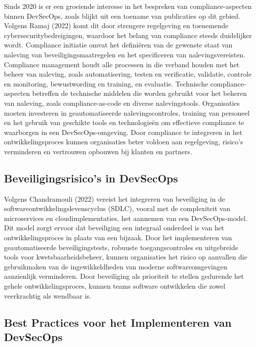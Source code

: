 \documentclass{hogent-article}
\begin{document}
   Sinds 2020 is er een groeiende interesse in het bespreken van compliance-aspecten binnen DevSecOps, zoals blijkt uit een toename van publicaties op dit gebied. Volgens Ramaj (2022) komt dit door strengere regelgeving en toenemende cybersecuritybedreigingen, waardoor het belang van compliance steeds duidelijker wordt.
   Compliance initiatie omvat het definiëren van de gewenste staat van naleving van beveiligingsmaatregelen en het specificeren van nalevingsvereisten. Compliance management houdt alle processen in die verband houden met het beheer van naleving, zoals automatisering, testen en verificatie, validatie, controle en monitoring, bewustwording en training, en evaluatie. Technische compliance-aspecten betreffen de technische middelen die worden gebruikt voor het beheren van naleving, zoals compliance-as-code en diverse nalevingstools.
   Organisaties moeten investeren in geautomatiseerde nalevingscontroles, training van personeel en het gebruik van geschikte tools en technologieën om effectieve compliance te waarborgen in een DevSecOps-omgeving. Door compliance te integreren in het ontwikkelingsproces kunnen organisaties beter voldoen aan regelgeving, risico's verminderen en vertrouwen opbouwen bij klanten en partners.\autocite{Ramaj2022}
   
   \subsection{Beveiligingsrisico's in DevSecOps}
   
    Volgens Chandramouli (2022) vereist het integreren van beveiliging in de softwareontwikkelingslevenscyclus (SDLC), vooral met de complexiteit van microservices en cloudimplementaties, het aannemen van een DevSecOps-model. Dit model zorgt ervoor dat beveiliging een integraal onderdeel is van het ontwikkelingsproces in plaats van een bijzaak. Door het implementeren van geautomatiseerde beveiligingstests, robuuste toegangscontroles en uitgebreide tools voor kwetsbaarheidsbeheer, kunnen organisaties het risico op aanvallen die gebruikmaken van de ingewikkeldheden van moderne softwareomgevingen aanzienlijk verminderen. Door beveiliging als prioriteit te stellen gedurende het gehele ontwikkelingsproces, kunnen teams software ontwikkelen die zowel veerkrachtig als wendbaar is.\\ \autocite{Chandramouli2022}
   
   \subsection{Best Practices voor het Implementeren van DevSecOps}
   
\end{document}
